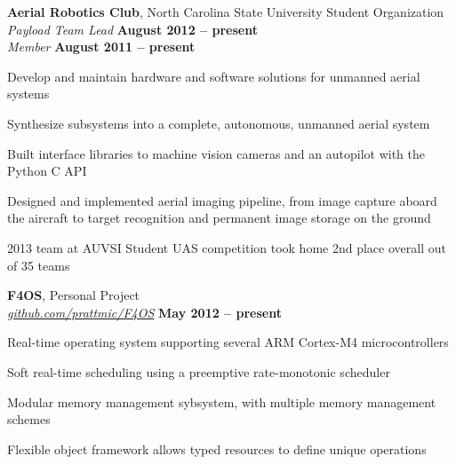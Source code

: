 \documentclass[margin,line,letterpaper]{resume}
\begin{document}
\begin{resume}
    \textbf{Aerial Robotics Club}, North Carolina State University Student Organization \vspace{1mm}\\\vspace{1mm}%
    \textsl{Payload Team Lead} \hfill \textbf{August 2012 -- present}\\
    \textsl{Member} \hfill \textbf{August 2011 -- present}\vspace{-3mm}\\
    \begin{list2}
    \item Develop and maintain hardware and software solutions for unmanned aerial systems
    \item Synthesize subsystems into a complete, autonomous, unmanned aerial system
    \item Built interface libraries to machine vision cameras and an autopilot with the Python C API
    \item Designed and implemented aerial imaging pipeline, from image capture aboard the aircraft
        to target recognition and permanent image storage on the ground
    \item 2013 team at AUVSI Student UAS competition took home 2nd place overall out of 35 teams
    \end{list2}\vspace{-1.5mm}

    \textbf{F4OS}, Personal Project\vspace{1mm}\\\vspace{1mm}%
    \textsl{\href{http://github.com/prattmic/F4OS}{github.com/prattmic/F4OS}}  \hfill \textbf{May 2012 -- present} \vspace{-3mm}\\\vspace{-1mm}%
    \begin{list2}
    \item Real-time operating system supporting several ARM Cortex-M4 microcontrollers
    \item Soft real-time scheduling using a preemptive rate-monotonic scheduler
    \item Modular memory management sybsystem, with multiple memory management schemes
    \item Flexible object framework allows typed resources to define unique operations
    \end{list2}\vspace{-1.5mm}


\end{resume}
\end{document}
